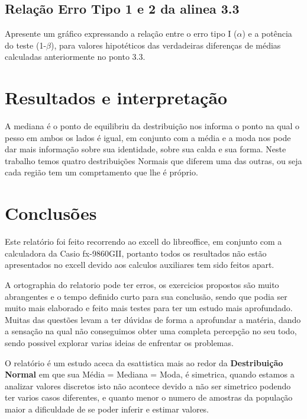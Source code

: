 \subsection{Relação Erro Tipo 1 e 2 da alinea 3.3}
\noindent
Apresente um gráfico expressando a relação entre o erro tipo I ($\alpha$) e a potência do teste (1-$\beta$), para valores hipotéticos das verdadeiras diferenças de médias calculadas anteriormente no ponto 3.3.













\newpage
\section{Resultados e interpretação}\label{Resultados}
A mediana é o ponto de equilibriu da destribuição nos informa o ponto na qual o pesso em ambos os lados é igual, em conjunto com a média e a moda nos pode dar mais informação sobre sua identidade, sobre sua calda e sua forma.
Neste trabalho temos quatro destribuições Normais que diferem uma das outras, ou seja cada região tem um comprtamento que lhe é próprio.




\section{Conclusões}\label{Conclusão}
Este relatório foi feito recorrendo ao excell do libreoffice, em conjunto com a calculadora da Casio fx-9860GII, portanto todos os resultados não estão apresentados no excell devido aos calculos auxiliares tem sido feitos apart.

A ortographia do relatorio pode ter erros, os exercicios propostos são muito abrangentes e o tempo definido curto para sua conclusão, sendo que podia ser muito mais elaborado e feito mais testes para ter um estudo mais aprofundado.
Muitas das questões levam a ter dúvidas de forma a aprofundar a matéria, dando a sensação na qual não conseguimos obter uma completa percepção no seu todo, sendo possivel explorar varias ideias de enfrentar os problemas. 

O relatório é um estudo aceca da esattistica mais ao redor da \textbf{Destribuição Normal} em que sua Média = Mediana = Moda, é simetrica, quando estamos a analizar valores discretos isto não acontece devido a não ser simetrico podendo ter varios casos diferentes, e quanto menor o numero de amostras da população maior a dificuldade de se poder inferir e estimar valores.

